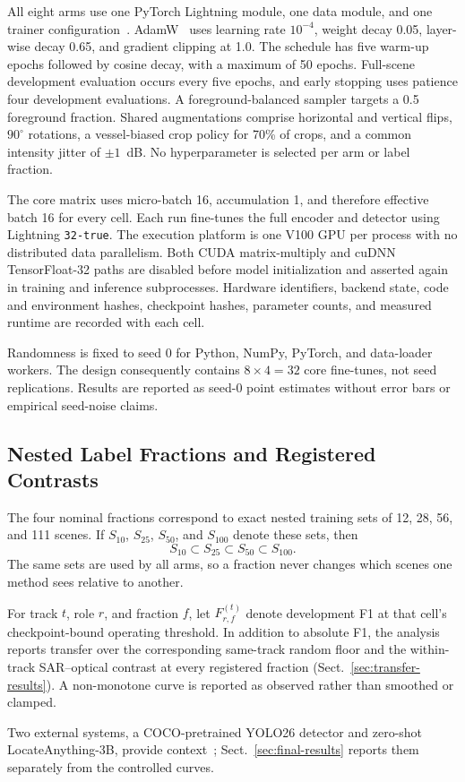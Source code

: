 All eight arms use one PyTorch Lightning module, one data module, and one
trainer configuration~\cite{falcon2019lightning}. AdamW~\cite{loshchilov2019decoupled} uses learning rate
$10^{-4}$, weight decay 0.05, layer-wise decay 0.65, and gradient clipping at
1.0. The schedule has five warm-up epochs followed by cosine decay, with a
maximum of 50 epochs. Full-scene development evaluation occurs every five
epochs, and early stopping uses patience four development evaluations. A
foreground-balanced sampler targets a 0.5 foreground fraction. Shared
augmentations comprise horizontal and vertical flips, $90^{\circ}$ rotations,
a vessel-biased crop policy for 70\% of crops, and a common intensity jitter
of $\pm1$~dB. No hyperparameter is selected per arm or label fraction.

The core matrix uses micro-batch 16, accumulation 1, and therefore effective
batch 16 for every cell. Each run fine-tunes the full encoder and detector
using Lightning \texttt{32-true}. The execution platform is one V100 GPU per
process with no distributed data parallelism. Both CUDA matrix-multiply
and cuDNN TensorFloat-32 paths are disabled before model initialization and
asserted again in training and inference subprocesses. Hardware identifiers,
backend state, code and environment hashes, checkpoint hashes, parameter
counts, and measured runtime are recorded with each cell.

Randomness is fixed to seed 0 for Python, NumPy, PyTorch, and data-loader
workers. The design consequently contains $8\times4=32$ core fine-tunes, not
seed replications. Results are reported as seed-0 point estimates without
error bars or empirical seed-noise claims.

\subsection{Nested Label Fractions and Registered Contrasts}

The four nominal fractions correspond to exact nested training sets of 12,
28, 56, and 111 scenes. If $S_{10}$, $S_{25}$, $S_{50}$, and $S_{100}$ denote
these sets, then
\begin{equation}
  S_{10}\subset S_{25}\subset S_{50}\subset S_{100}.
  \label{eq:nesting}
\end{equation}
The same sets are used by all arms, so a fraction never changes which scenes
one method sees relative to another.

For track $t$, role $r$, and fraction $f$, let $F^{(t)}_{r,f}$ denote
development F1 at that cell's checkpoint-bound operating threshold. In
addition to absolute F1, the analysis reports transfer over the corresponding
same-track random floor and the within-track SAR--optical contrast at every
registered fraction (Sect.~\ref{sec:transfer-results}). A non-monotone curve is reported
as observed rather than smoothed or clamped.

Two external systems, a COCO-pretrained YOLO26 detector and zero-shot
LocateAnything-3B, provide
context~\cite{jocher2026yolo26,wang2026locateanything};
Sect.~\ref{sec:final-results} reports them separately from the controlled
curves.
